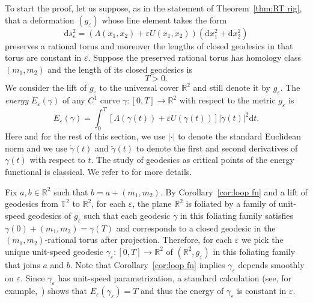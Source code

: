 \documentclass[11pt,letterpaper,oneside]{amsart}
\newcommand{\R}{\mathbb{R}}
\newcommand{\T}{\mathbb{T}}
\renewcommand{\epsilon}{\varepsilon}
\theoremstyle{definition}
\theoremstyle{remark}
\theoremstyle{definition}
\theoremstyle{remark}
\newcommand{\dif}{\mathrm{d}}
\begin{document}
\medskip

To start the proof, let us suppose, as in the statement of Theorem~\ref{thm:RT rig}, that a deformation $(g_\epsilon)$ whose line element takes the form
\begin{equation}\label{eq:conformal deform in pf}
    \dif s^2_\epsilon = ( \Lambda(x_1, x_2) + \epsilon U(x_1, x_2)) (\dif x_1^2 + \dif x_2^2)
\end{equation}
preserves a rational torus and moreover the lengths of closed geodesics in that torus are constant in $\epsilon$.
Suppose the preserved rational torus has homology class $(m_1, m_2)$ and the length of its closed geodesics is $$T > 0.$$
We consider the lift of $g_\epsilon$ to the universal cover $\R^2$ and still denote it by $g_\epsilon$.
The \textit{energy} $E_\epsilon(\gamma)$ of any $C^1$ curve $\gamma: [0,T] \to \R^2$ with respect to the metric $g_\epsilon$ is 
\begin{equation}\label{eq:energy}
    E_\epsilon (\gamma)  = \int_0^T [\Lambda(\gamma(t)) + \epsilon U(\gamma(t))] |\dot\gamma(t)|^2 \dif t.
\end{equation}
Here and for the rest of this section, we use $|\cdot|$ to denote the standard Euclidean norm and we use $\dot\gamma(t)$ and $\ddot\gamma(t)$ to denote the first and second derivatives of $\gamma(t)$ with respect to $t$.
The study of geodesics as critical points of the energy functional is classical.
We refer to \cite{milnor1963morse} for more details.

\medskip

Fix $a, b \in \R^2$ such that $b = a + (m_1, m_2)$.
By Corollary~\ref{cor:loop fn} and a lift of geodesics from $\T^2$ to $\R^2$, for each $\epsilon$, the plane $\R^2$ is foliated by a family of unit-speed geodesics of $g_\epsilon$ such that each geodesic $\gamma$ in this foliating family satisfies $\gamma(0) + (m_1, m_2) = \gamma(T)$ and corresponds to a closed geodesic in the $(m_1, m_2)$-rational torus after projection.
Therefore, for each $\epsilon$ we pick the unique unit-speed geodesic $\gamma_\epsilon:[0,T] \to \R^2$ of $(\R^2, g_\epsilon)$ in this foliating family that joins $a$ and $b$.
Note that Corollary~\ref{cor:loop fn} implies $\gamma_\epsilon$ depends smoothly on $\epsilon$.
Since $\gamma_\epsilon$ has unit-speed parametrization, a standard calculation (see, for example,~\cite[\S 12]{milnor1963morse}) shows that $E_\epsilon(\gamma_\epsilon) = T$ and thus the energy of $\gamma_\epsilon$ is constant in $\epsilon$.

\medskip
\end{document}
